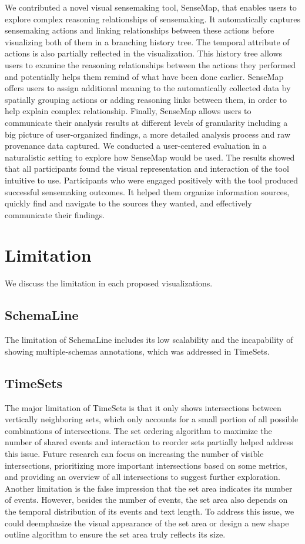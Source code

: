 We contributed a novel visual sensemaking tool, SenseMap, that enables users to explore complex reasoning relationships of sensemaking. It automatically captures sensemaking actions and linking relationships between these actions before visualizing both of them in a branching history tree. The temporal attribute of actions is also partially reflected in the visualization. This history tree allows users to examine the reasoning relationships between the actions they performed and potentially helps them remind of what have been done earlier. SenseMap offers users to assign additional meaning to the automatically collected data by spatially grouping actions or adding reasoning links between them, in order to help explain complex relationship. Finally, SenseMap allows users to communicate their analysis results at different levels of granularity including a big picture of user-organized findings, a more detailed analysis process and raw provenance data captured. We conducted a user-centered evaluation in a naturalistic setting to explore how SenseMap would be used. The results showed that all participants found the visual representation and interaction of the tool intuitive to use. Participants who were engaged positively with the tool produced successful sensemaking outcomes. It helped them organize information sources, quickly find and navigate to the sources they wanted, and effectively communicate their findings.

\section{Limitation}
We discuss the limitation in each proposed visualizations.

\subsection{SchemaLine}
 The limitation of SchemaLine includes its low scalability and the incapability of showing multiple-schemas annotations, which was addressed in TimeSets.

\subsection{TimeSets}
The major limitation of TimeSets is that it only shows intersections between vertically neighboring sets, which only accounts for a small portion of all possible combinations of intersections. The set ordering algorithm to maximize the number of shared events and interaction to reorder sets partially helped address this issue. Future research can focus on increasing the number of visible intersections, prioritizing more important intersections based on some metrics, and providing an overview of all intersections to suggest further exploration. Another limitation is the false impression that the set area indicates its number of events. However, besides the number of events, the set area also depends on the temporal distribution of its events and text length. To address this issue, we could deemphasize the visual appearance of the set area or design a new shape outline algorithm to ensure the set area truly reflects its size.

